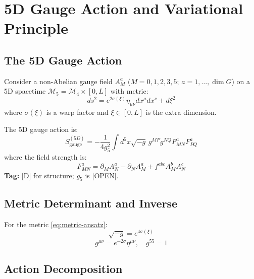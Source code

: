 \documentclass[11pt,a4paper]{article}
\begin{document}
\section{5D Gauge Action and Variational Principle}
\label{sec:5d-action}

\subsection{The 5D Gauge Action}

Consider a non-Abelian gauge field $A_M^a$ ($M = 0,1,2,3,5$; $a = 1,\ldots,\dim G$)
on a 5D spacetime $\mathcal{M}_5 = \mathcal{M}_4 \times [0,L]$ with metric:
\begin{equation}
  ds^2 = e^{2\sigma(\xi)} \eta_{\mu\nu} dx^\mu dx^\nu + d\xi^2
  \label{eq:metric-ansatz}
\end{equation}
where $\sigma(\xi)$ is a warp factor and $\xi \in [0,L]$ is the extra dimension.

The 5D gauge action is:
\begin{equation}
  \boxed{S_{\text{gauge}}^{(5D)} = -\frac{1}{4g_5^2} \int d^5x \sqrt{-g} \,
    g^{MP} g^{NQ} F_{MN}^a F_{PQ}^a}
  \label{eq:5d-gauge-action}
\end{equation}
where the field strength is:
\begin{equation}
  F_{MN}^a = \partial_M A_N^a - \partial_N A_M^a + f^{abc} A_M^b A_N^c
  \label{eq:field-strength}
\end{equation}
\textbf{Tag:} [D] for structure; $g_5$ is [OPEN].

\subsection{Metric Determinant and Inverse}

For the metric \eqref{eq:metric-ansatz}:
\begin{equation}
  \sqrt{-g} = e^{4\sigma(\xi)}
  \label{eq:sqrt-g}
\end{equation}
\begin{equation}
  g^{\mu\nu} = e^{-2\sigma} \eta^{\mu\nu}, \quad g^{55} = 1
  \label{eq:inverse-metric}
\end{equation}

\subsection{Action Decomposition}
\end{document}
